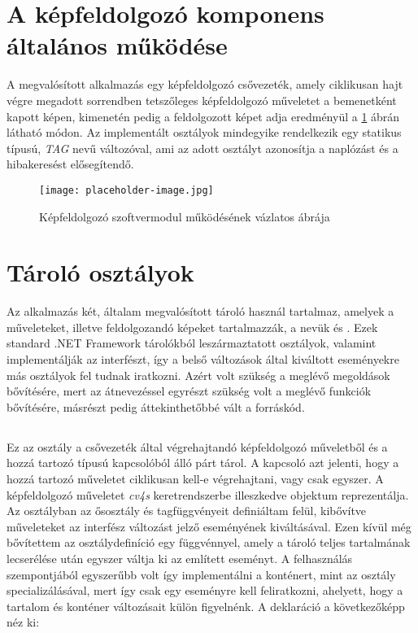 \section{A képfeldolgozó komponens általános működése}

A megvalósított alkalmazás egy képfeldolgozó csővezeték, amely ciklikusan hajt végre megadott sorrendben tetszőleges képfeldolgozó műveletet a bemenetként kapott képen, kimenetén pedig a feldolgozott képet adja eredményül a \ref{fig:placeholder_2} ábrán látható módon. Az implementált osztályok mindegyike rendelkezik egy statikus  típusú, \emph{TAG} nevű változóval, ami az adott osztályt azonosítja a naplózást és a hibakeresést elősegítendő.

\begin{figure}[h]
\texttt{[image: placeholder-image.jpg]}
\centering
\caption{Képfeldolgozó szoftvermodul működésének vázlatos ábrája}
\label{fig:placeholder_2}
\end{figure}

\section{Tároló osztályok}

Az alkalmazás két, általam megvalósított tároló használ tartalmaz, amelyek a műveleteket, illetve feldolgozandó képeket tartalmazzák, a nevük  és . Ezek standard .NET Framework tárolókból leszármaztatott osztályok, valamint implementálják az   interfészt, így a belső változások által kiváltott eseményekre más osztályok fel tudnak iratkozni.
Azért volt szükség a meglévő megoldások bővítésére, mert az átnevezéssel egyrészt szükség volt a meglévő funkciók bővítésére, másrészt pedig áttekinthetőbbé vált a forráskód.

\subsection{} \label{subs:OperationList}
Ez az osztály a csővezeték által végrehajtandó képfeldolgozó műveletből és a hozzá tartozó típusú kapcsolóból álló párt tárol. A kapcsoló azt jelenti, hogy a hozzá tartozó műveletet ciklikusan kell-e végrehajtani, vagy csak egyszer. A képfeldolgozó műveletet \emph{cv4s} keretrendszerbe illeszkedve  objektum reprezentálja. Az osztályban az ősosztály  és  tagfüggvényeit definiáltam felül, kibővítve műveleteket az  interfész változást jelző eseményének kiváltásával. Ezen kívül még bővítettem az osztálydefiníció egy  függvénnyel, amely a tároló teljes tartalmának lecserélése után egyszer váltja ki az említett eseményt. A felhasználás szempontjából egyszerűbb volt így implementálni a konténert, mint az  osztály specializálásával, mert így csak egy eseményre kell feliratkozni, ahelyett, hogy a tartalom és konténer változásait külön figyelnénk.  A deklaráció a következőképp néz ki:

